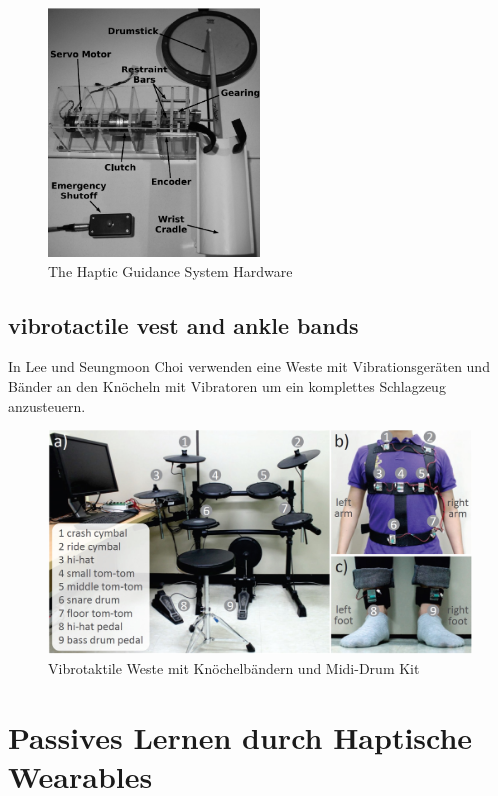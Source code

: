 \documentclass[ngerman,runningheads,a4paper]{llncs}
\begin{document}
\begin{figure}
  \includegraphics[width = 0.5\textwidth]{pictures/hapticdrumstick1}
  \caption{The Haptic Guidance System Hardware \cite{4479984}}
\end{figure}

\subsection{vibrotactile vest and ankle bands}
In Lee und Seungmoon Choi \cite{6775447} verwenden eine Weste mit Vibrationsgeräten und Bänder an den Knöcheln mit Vibratoren um ein komplettes Schlagzeug anzusteuern.

\begin{figure}
  \includegraphics[width = \textwidth]{pictures/vibrotactilevest2}
  \caption{Vibrotaktile Weste mit Knöchelbändern und Midi-Drum Kit\cite{6775447}}
\end{figure}

\section{Passives Lernen durch Haptische Wearables}
\end{document}
